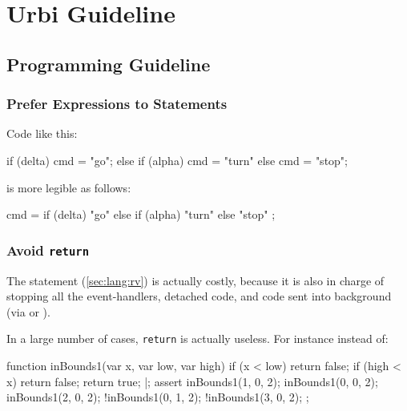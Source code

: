 
\chapter{Urbi Guideline}
\label{sec:guideline}

\section{\us Programming Guideline}

\subsection{Prefer Expressions to Statements}

Code like this:

\begin{urbiunchecked}
if (delta)
  cmd = "go";
else if (alpha)
  cmd = "turn"
else
  cmd = "stop";
\end{urbiunchecked}

\noindent
is more legible as follows:

\begin{urbiunchecked}
cmd =
  {
    if      (delta) "go"
    else if (alpha) "turn"
    else            "stop"
  };
\end{urbiunchecked}


\subsection{Avoid \lstinline{return}}
\label{sec:guideline:return}

The  statement (\autoref{sec:lang:rv}) is actually costly,
because it is also in charge of stopping all the event-handlers, detached
code, and code sent into background (via \samp{,} or \samp{\&}).

In a large number of cases, \lstinline|return| is actually useless.  For
instance instead of:

\begin{urbiscript}
function inBounds1(var x, var low, var high)
{
  if (x < low)
    return false;
  if (high < x)
    return false;
  return true;
}|;
assert
{
  inBounds1(1, 0, 2);    inBounds1(0, 0, 2);  inBounds1(2, 0, 2);
  !inBounds1(0, 1, 2);  !inBounds1(3, 0, 2);
};
\end{urbiscript}

